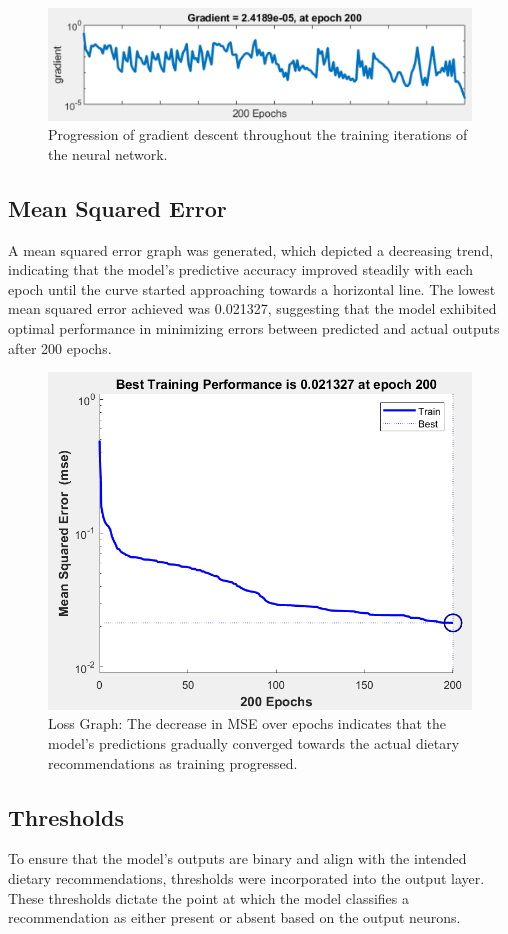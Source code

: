 \begin{figure}[H]
    \centering
    \includegraphics[width=\linewidth]{Figures/gradient2.png}
    \caption{Progression of gradient descent throughout the training iterations of the neural network.}
    \label{fig:tcanther}
\end{figure}

\subsection{Mean Squared Error}
A mean squared error graph was generated, which depicted a decreasing trend, indicating that the model's predictive accuracy improved steadily with each epoch until the curve started approaching towards a horizontal line. The lowest mean squared error achieved was 0.021327, suggesting that the model exhibited optimal performance in minimizing errors between predicted and actual outputs after 200 epochs.

\begin{figure}[!htpb]
    \centering
    \includegraphics[width=\linewidth]{Figures/MSE2.png}
    \caption{Loss Graph: The decrease in MSE over epochs indicates that the model's predictions gradually converged towards the actual dietary recommendations as training progressed.}
\end{figure}

\subsection{Thresholds}
To ensure that the model's outputs are binary and align with the intended dietary recommendations, thresholds were incorporated into the output layer. These thresholds dictate the point at which the model classifies a recommendation as either present or absent based on the output neurons.